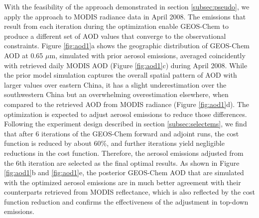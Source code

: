  With the feasibility of the approach demonstrated in section \ref{subsec:pseudo}, 
 we apply the approach to MODIS radiance data in April 2008. 
 The emissions that result from each iteration during the optimization 
 enable GEOS-Chem to produce a different set of AOD values 
 that converge to the observational constraints. 
 Figure \ref{fig:aod1}a shows the geographic distribution of GEOS-Chem AOD at 0.65 $\mu$m, 
 simulated with prior aerosol emissions, averaged coincidently with retrieved daily MODIS AOD 
 (Figure \ref{fig:aod1}c) during April 2008. 
 While the prior model simulation captures the overall spatial pattern of AOD 
 with larger values over eastern China, 
 it has a slight underestimation over the southwestern China 
 but an overwhelming overestimation elsewhere, 
 when compared to the retrieved AOD from MODIS radiance (Figure \ref{fig:aod1}d). 
 The optimization is expected to adjust aerosol emissions to reduce those differences. 
 Following the experiment design described in section \ref{subsec:selectems}, 
 we find that after 6 iterations of the GEOS-Chem forward and adjoint runs, 
 the cost function is reduced by about 60\%, 
 and further iterations yield negligible reductions in the cost function. 
 Therefore, the aerosol emissions adjusted from the 6th iteration are selected as the final optimal results. 
 As shown in Figure \ref{fig:aod1}b and \ref{fig:aod1}e, the posterior GEOS-Chem AOD 
 that are simulated with the optimized aerosol emissions 
 are in much better agreement with their counterparts retrieved from MODIS reflectance, 
 which is also reflected by the cost function reduction and 
 confirms the effectiveness of the adjustment in top-down emissions.

